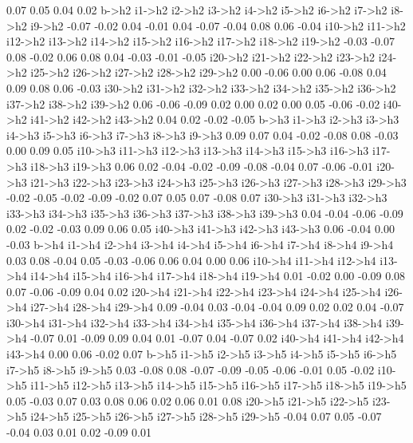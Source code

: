 \documentclass{article}
\begin{document}
\begin{Schunk}
\begin{Soutput}
   0.07    0.05    0.04    0.02 
  b->h2  i1->h2  i2->h2  i3->h2  i4->h2  i5->h2  i6->h2  i7->h2  i8->h2  i9->h2 
  -0.07   -0.02    0.04   -0.01    0.04   -0.07   -0.04    0.08    0.06   -0.04 
i10->h2 i11->h2 i12->h2 i13->h2 i14->h2 i15->h2 i16->h2 i17->h2 i18->h2 i19->h2 
  -0.03   -0.07    0.08   -0.02    0.06    0.08    0.04   -0.03   -0.01   -0.05 
i20->h2 i21->h2 i22->h2 i23->h2 i24->h2 i25->h2 i26->h2 i27->h2 i28->h2 i29->h2 
   0.00   -0.06    0.00    0.06   -0.08    0.04    0.09    0.08    0.06   -0.03 
i30->h2 i31->h2 i32->h2 i33->h2 i34->h2 i35->h2 i36->h2 i37->h2 i38->h2 i39->h2 
   0.06   -0.06   -0.09    0.02    0.00    0.02    0.00    0.05   -0.06   -0.02 
i40->h2 i41->h2 i42->h2 i43->h2 
   0.04    0.02   -0.02   -0.05 
  b->h3  i1->h3  i2->h3  i3->h3  i4->h3  i5->h3  i6->h3  i7->h3  i8->h3  i9->h3 
   0.09    0.07    0.04   -0.02   -0.08    0.08   -0.03    0.00    0.09    0.05 
i10->h3 i11->h3 i12->h3 i13->h3 i14->h3 i15->h3 i16->h3 i17->h3 i18->h3 i19->h3 
   0.06    0.02   -0.04   -0.02   -0.09   -0.08   -0.04    0.07   -0.06   -0.01 
i20->h3 i21->h3 i22->h3 i23->h3 i24->h3 i25->h3 i26->h3 i27->h3 i28->h3 i29->h3 
  -0.02   -0.05   -0.02   -0.09   -0.02    0.07    0.05    0.07   -0.08    0.07 
i30->h3 i31->h3 i32->h3 i33->h3 i34->h3 i35->h3 i36->h3 i37->h3 i38->h3 i39->h3 
   0.04   -0.04   -0.06   -0.09    0.02   -0.02   -0.03    0.09    0.06    0.05 
i40->h3 i41->h3 i42->h3 i43->h3 
   0.06   -0.04    0.00   -0.03 
  b->h4  i1->h4  i2->h4  i3->h4  i4->h4  i5->h4  i6->h4  i7->h4  i8->h4  i9->h4 
   0.03    0.08   -0.04    0.05   -0.03   -0.06    0.06    0.04    0.00    0.06 
i10->h4 i11->h4 i12->h4 i13->h4 i14->h4 i15->h4 i16->h4 i17->h4 i18->h4 i19->h4 
   0.01   -0.02    0.00   -0.09    0.08    0.07   -0.06   -0.09    0.04    0.02 
i20->h4 i21->h4 i22->h4 i23->h4 i24->h4 i25->h4 i26->h4 i27->h4 i28->h4 i29->h4 
   0.09   -0.04    0.03   -0.04   -0.04    0.09    0.02    0.02    0.04   -0.07 
i30->h4 i31->h4 i32->h4 i33->h4 i34->h4 i35->h4 i36->h4 i37->h4 i38->h4 i39->h4 
  -0.07    0.01   -0.09    0.09    0.04    0.01   -0.07    0.04   -0.07    0.02 
i40->h4 i41->h4 i42->h4 i43->h4 
   0.00    0.06   -0.02    0.07 
  b->h5  i1->h5  i2->h5  i3->h5  i4->h5  i5->h5  i6->h5  i7->h5  i8->h5  i9->h5 
   0.03   -0.08    0.08   -0.07   -0.09   -0.05   -0.06   -0.01    0.05   -0.02 
i10->h5 i11->h5 i12->h5 i13->h5 i14->h5 i15->h5 i16->h5 i17->h5 i18->h5 i19->h5 
   0.05   -0.03    0.07    0.03    0.08    0.06    0.02    0.06    0.01    0.08 
i20->h5 i21->h5 i22->h5 i23->h5 i24->h5 i25->h5 i26->h5 i27->h5 i28->h5 i29->h5 
  -0.04    0.07    0.05   -0.07   -0.04    0.03    0.01    0.02   -0.09    0.01 

\end{Soutput}
\end{Schunk}
\end{document}
